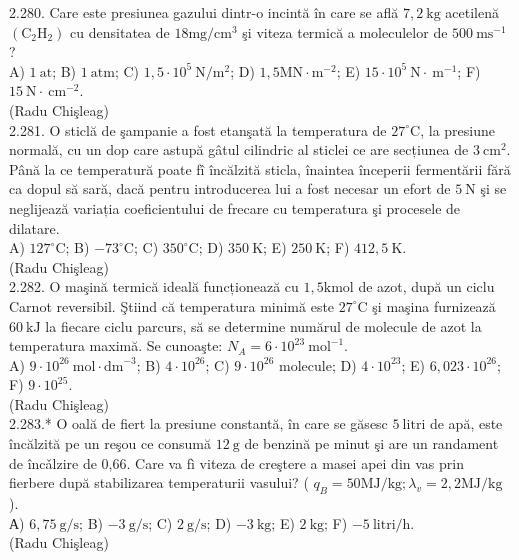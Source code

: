 \documentclass[10pt]{article}
\begin{document}
2.280. Care este presiunea gazului dintr-o incintă în care se află $7,2 \mathrm{~kg}$ acetilenă $\left(\mathrm{C}_{2} \mathrm{H}_{2}\right)$ cu densitatea de $18 \mathrm{mg} / \mathrm{cm}^{3}$ şi viteza termică a moleculelor de $500 \mathrm{~ms}^{-1}$ ?\\ A) $1 \mathrm{~at}$; B) $1 \mathrm{~atm}$; C) $1,5 \cdot 10^{5} \mathrm{~N} / \mathrm{m}^{2}$; D) $1,5 \mathrm{MN} \cdot \mathrm{m}^{-2}$; E) $15 \cdot 10^{5} \mathrm{~N} \cdot \mathrm{~m}^{-1}$; F) $15 \mathrm{~N} \cdot \mathrm{~cm}^{-2}$.\\ (Radu Chişleag)\\

2.281. O sticlă de şampanie a fost etanşată la temperatura de $27^{\circ} \mathrm{C}$, la presiune normală, cu un dop care astupă gâtul cilindric al sticlei ce are secțiunea de $3 \mathrm{~cm}^{2}$. Până la ce temperatură poate fî încălzită sticla, înaintea începerii fermentării fără ca dopul să sară, dacă pentru introducerea lui a fost necesar un efort de $5 \mathrm{~N}$ şi se neglijează variația coeficientului de frecare cu temperatura şi procesele de dilatare.\\ A) $127^{\circ} \mathrm{C}$; B) $-73^{\circ} \mathrm{C}$; C) $350^{\circ} \mathrm{C}$; D) $350 \mathrm{~K}$; E) $250 \mathrm{~K}$; F) $412,5 \mathrm{~K}$.\\ (Radu Chişleag)\\

2.282. O maşină termică ideală funcționează cu $1,5 \mathrm{kmol}$ de azot, după un ciclu Carnot reversibil. Ştiind că temperatura minimă este $27^{\circ} \mathrm{C}$ şi maşina furnizează $60 \mathrm{~kJ}$ la fiecare ciclu parcurs, să se determine numărul de molecule de azot la temperatura maximă. Se cunoaşte: $N_{A}=6 \cdot 10^{23} \mathrm{~mol}^{-1}$.\\ A) $9 \cdot 10^{26} \mathrm{~mol} \cdot \mathrm{dm}^{-3}$; B) $4 \cdot 10^{26}$; C) $9 \cdot 10^{26}$ molecule; D) $4 \cdot 10^{23}$; E) $6,023 \cdot 10^{26}$; F) $9 \cdot 10^{25}$.\\ (Radu Chişleag)\\

2.283.* O oală de fiert la presiune constantă, în care se găsesc $5 \mathrm{~litri}$ de apă, este încălzită pe un reşou ce consumă $12 \mathrm{~g}$ de benzină pe minut şi are un randament de încǎlzire de 0,66. Care va fì viteza de creştere a masei apei din vas prin fierbere după stabilizarea temperaturii vasului? ( $q_{B}=50 \mathrm{MJ} / \mathrm{kg} ; \lambda_{v}=2,2 \mathrm{MJ} / \mathrm{kg}$ ).\\ А) $6,75 \mathrm{~g} / \mathrm{s}$; B) $-3 \mathrm{~g} / \mathrm{s}$; C) $2 \mathrm{~g} / \mathrm{s}$; D) $-3 \mathrm{~kg}$; E) $2 \mathrm{~kg}$; F) $-5 \mathrm{~litri} / \mathrm{h}$.\\ (Radu Chişleag)\\
\end{document}
